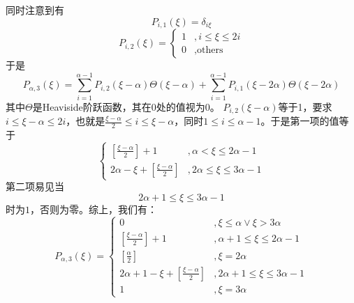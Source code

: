\documentclass{ctexart}
\begin{document}
	同时注意到有
	\begin{equation}
	P_{i,1}(\xi)=\delta_{i\xi}
	\end{equation}
	\begin{equation}
	P_{i,2}(\xi)=\begin{cases}1 & ,i\leq\xi\leq 2i\\0 & ,\text{others}\end{cases}
	\end{equation}
	于是
	\begin{equation}
	P_{\alpha,3}(\xi)=\sum_{i=1}^{\alpha-1}P_{i,2}(\xi-\alpha)\Theta(\xi-\alpha)+\sum_{i=1}^{\alpha-1}P_{i,1}(\xi-2\alpha)\Theta(\xi-2\alpha)
	\end{equation}
	其中$\Theta$是Heaviside阶跃函数，其在$0$处的值视为$0$。
	$P_{i,2}(\xi-\alpha)$等于1，要求$i\leq\xi-\alpha\leq 2i$，也就是$\frac{\xi-\alpha}{2}\leq i\leq \xi-\alpha$，同时$1\leq i\leq \alpha-1$。于是第一项的值等于
	\begin{equation}
	\begin{cases}
	\left[\frac{\xi-\alpha}{2}\right]+1 & , \alpha<\xi\leq 2\alpha-1\\
	2\alpha-\xi+\left[\frac{\xi-\alpha}{2}\right] &, 2\alpha\leq\xi\leq 3\alpha-1
	\end{cases}
	\end{equation}
	第二项易见当
	\begin{equation}
	2\alpha+1\leq\xi\leq 3\alpha-1
	\end{equation}
	时为$1$，否则为零。综上，我们有：
	\begin{equation}
	P_{\alpha,3}(\xi)=\begin{cases}
	0 & ,\xi\leq\alpha\lor\xi>3\alpha\\
	\left[\frac{\xi-\alpha}{2}\right]+1 & , \alpha+1\leq\xi\leq 2\alpha-1\\
	\left[\frac{\alpha}{2}\right] & , \xi=2\alpha\\
	2\alpha+1-\xi+\left[\frac{\xi-\alpha}{2}\right] & , 2\alpha+1\leq\xi\leq 3\alpha-1\\
	1 &, \xi=3\alpha
	\end{cases}
	\end{equation}
\end{document}
